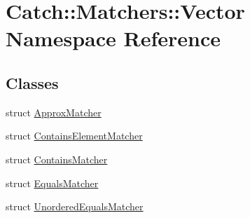 \hypertarget{namespace_catch_1_1_matchers_1_1_vector}{}\section{Catch\+:\+:Matchers\+:\+:Vector Namespace Reference}
\label{namespace_catch_1_1_matchers_1_1_vector}
\subsection*{Classes}
\begin{DoxyCompactItemize}
\item 
struct \mbox{\hyperlink{struct_catch_1_1_matchers_1_1_vector_1_1_approx_matcher}{Approx\+Matcher}}
\item 
struct \mbox{\hyperlink{struct_catch_1_1_matchers_1_1_vector_1_1_contains_element_matcher}{Contains\+Element\+Matcher}}
\item 
struct \mbox{\hyperlink{struct_catch_1_1_matchers_1_1_vector_1_1_contains_matcher}{Contains\+Matcher}}
\item 
struct \mbox{\hyperlink{struct_catch_1_1_matchers_1_1_vector_1_1_equals_matcher}{Equals\+Matcher}}
\item 
struct \mbox{\hyperlink{struct_catch_1_1_matchers_1_1_vector_1_1_unordered_equals_matcher}{Unordered\+Equals\+Matcher}}
\end{DoxyCompactItemize}
